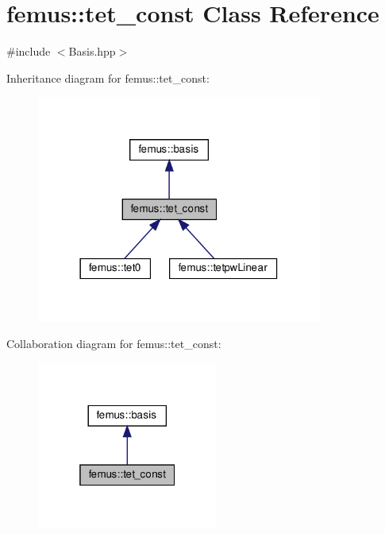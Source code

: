 \hypertarget{classfemus_1_1tet__const}{}\section{femus\+:\+:tet\+\_\+const Class Reference}
\label{classfemus_1_1tet__const}


{\ttfamily \#include $<$Basis.\+hpp$>$}



Inheritance diagram for femus\+:\+:tet\+\_\+const\+:
\nopagebreak
\begin{figure}[H]
\begin{center}
\leavevmode
\includegraphics[width=266pt]{classfemus_1_1tet__const__inherit__graph}
\end{center}
\end{figure}


Collaboration diagram for femus\+:\+:tet\+\_\+const\+:
\nopagebreak
\begin{figure}[H]
\begin{center}
\leavevmode
\includegraphics[width=169pt]{classfemus_1_1tet__const__coll__graph}
\end{center}
\end{figure}
